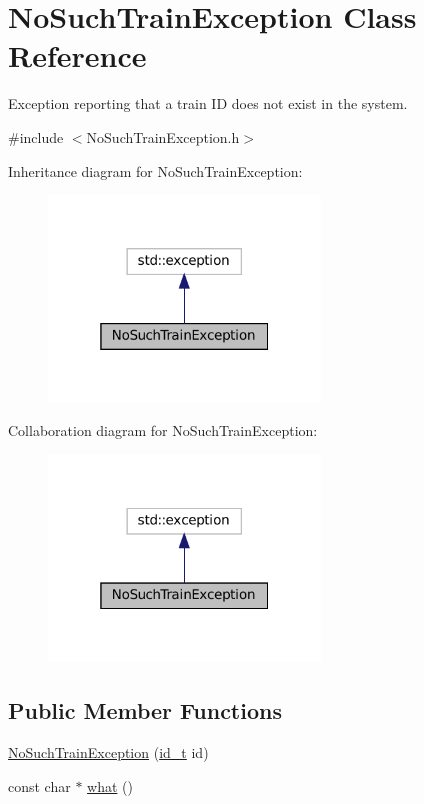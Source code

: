 \hypertarget{classNoSuchTrainException}{}\section{No\+Such\+Train\+Exception Class Reference}
\label{classNoSuchTrainException}


Exception reporting that a train ID does not exist in the system.  




{\ttfamily \#include $<$No\+Such\+Train\+Exception.\+h$>$}



Inheritance diagram for No\+Such\+Train\+Exception\+:
\nopagebreak
\begin{figure}[H]
\begin{center}
\leavevmode
\includegraphics[width=205pt]{classNoSuchTrainException__inherit__graph}
\end{center}
\end{figure}


Collaboration diagram for No\+Such\+Train\+Exception\+:
\nopagebreak
\begin{figure}[H]
\begin{center}
\leavevmode
\includegraphics[width=205pt]{classNoSuchTrainException__coll__graph}
\end{center}
\end{figure}
\subsection*{Public Member Functions}
\begin{DoxyCompactItemize}
\item 
\mbox{\hyperlink{classNoSuchTrainException_ae60439498bd6e552159ed1c50335daba}{No\+Such\+Train\+Exception}} (\mbox{\hyperlink{project__utils_8h_a8f3a969054ad2200720b96e7e23dd4e1}{id\+\_\+t}} id)
\item 
const char $\ast$ \mbox{\hyperlink{classNoSuchTrainException_ad2739cfe2389af42ee3f6780ff1392c5}{what}} ()
\end{DoxyCompactItemize}


